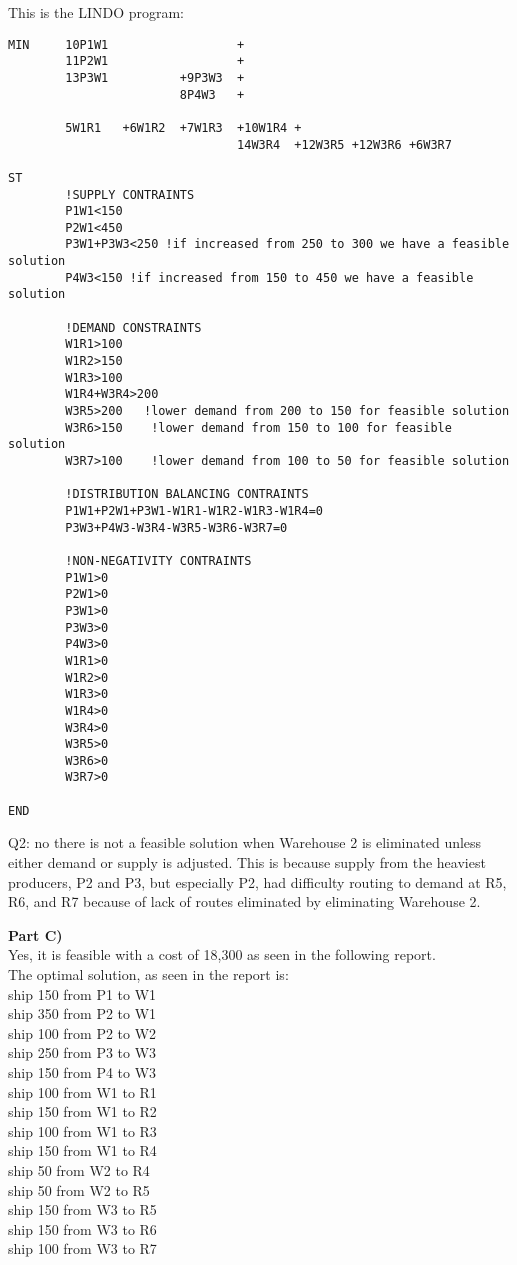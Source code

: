 This is the LINDO program:\\
\begin{verbatim}
MIN     10P1W1                  +
        11P2W1                  +
        13P3W1          +9P3W3  +
                        8P4W3   +
        
        5W1R1   +6W1R2  +7W1R3  +10W1R4 +
                                14W3R4  +12W3R5 +12W3R6 +6W3R7

ST
        !SUPPLY CONTRAINTS
        P1W1<150
        P2W1<450
        P3W1+P3W3<250 !if increased from 250 to 300 we have a feasible solution
        P4W3<150 !if increased from 150 to 450 we have a feasible solution

        !DEMAND CONSTRAINTS
        W1R1>100
        W1R2>150
        W1R3>100
        W1R4+W3R4>200
        W3R5>200   !lower demand from 200 to 150 for feasible solution
        W3R6>150    !lower demand from 150 to 100 for feasible solution
        W3R7>100    !lower demand from 100 to 50 for feasible solution  

        !DISTRIBUTION BALANCING CONTRAINTS
        P1W1+P2W1+P3W1-W1R1-W1R2-W1R3-W1R4=0
        P3W3+P4W3-W3R4-W3R5-W3R6-W3R7=0

        !NON-NEGATIVITY CONTRAINTS
        P1W1>0
        P2W1>0
        P3W1>0
        P3W3>0
        P4W3>0
        W1R1>0
        W1R2>0
        W1R3>0
        W1R4>0
        W3R4>0
        W3R5>0
        W3R6>0
        W3R7>0

END
\end{verbatim}

Q2: no there is not a feasible solution when Warehouse 2 is eliminated unless either demand or supply is adjusted.  This is because supply from the heaviest producers, P2 and P3, but especially P2, had difficulty routing to demand at R5, R6, and R7 because of lack
of routes eliminated by eliminating Warehouse 2.

\textbf{Part C)}\\
Yes, it is feasible with a cost of 18,300 as seen in the following report.\\
The optimal solution, as seen in the report is:\\
ship 150 from P1 to W1\\
ship 350 from P2 to W1\\
ship 100 from P2 to W2\\
ship 250 from P3 to W3\\
ship 150 from P4 to W3\\
ship 100 from W1 to R1\\
ship 150 from W1 to R2\\
ship 100 from W1 to R3\\
ship 150 from W1 to R4\\
ship 50 from W2 to R4\\
ship 50 from W2 to R5\\
ship 150 from W3 to R5\\
ship 150 from W3 to R6\\
ship 100 from W3 to R7\\

